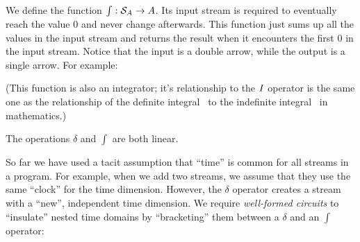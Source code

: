 
We define the function $\int : \mathcal{S}_{A} \rightarrow A$.  Its input
stream is required to eventually reach the value 0 and never change
afterwards.  This function just sums up all the values in the input
stream and returns the result when it encounters the first 0 in the
input stream.  Notice that the input is a double arrow, while the
output is a single arrow.  For example:


(This function is also an integrator; it's relationship to the $\mathit{I}$
operator is the same one as the relationship of the definite
integral~\cite{integral} to the indefinite
integral~\cite{antiderivative} in mathematics.)

The operations $\delta$ and $\int$ are both linear.



So far we have used a tacit assumption that ``time'' is common for all
streams in a program.  For example, when we add two streams, we assume
that they use the same ``clock'' for the time dimension.  However, the
$\delta$ operator creates a stream with a ``new'', independent time
dimension.  We require \emph{well-formed circuits} to ``insulate''
nested time domains by ``bracketing'' them between a $\delta$ and an
$\int$ operator:

\begin{center}
\end{center}

